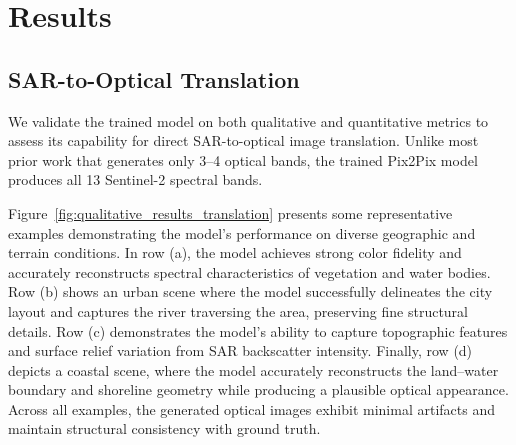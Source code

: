 \documentclass[remotesensing,article,submit,pdftex,moreauthors]{Definitions/mdpi}
\begin{document}
\section{Results}
\subsection{SAR-to-Optical Translation}
We validate the trained model on both qualitative and quantitative metrics to assess its capability for direct SAR-to-optical image translation. Unlike most prior work that generates only 3–4 optical bands, the trained Pix2Pix model produces all 13 Sentinel-2 spectral bands.

Figure~\ref{fig:qualitative_results_translation} presents some representative examples demonstrating the model's performance on diverse geographic and terrain conditions. In row (a), the model achieves strong color fidelity and accurately reconstructs spectral characteristics of vegetation and water bodies. Row (b) shows an urban scene where the model successfully delineates the city layout and captures the river traversing the area, preserving fine structural details. Row (c) demonstrates the model's ability to capture topographic features and surface relief variation from SAR backscatter intensity. Finally, row (d) depicts a coastal scene, where the model accurately reconstructs the land--water boundary and shoreline geometry while producing a plausible optical appearance. Across all examples, the generated optical images exhibit minimal artifacts and maintain structural consistency with ground truth.
\end{document}
